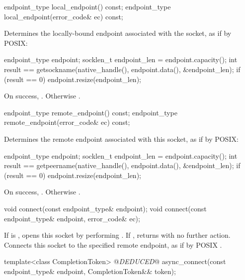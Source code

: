 \begin{itemdecl}
endpoint_type local_endpoint() const;
endpoint_type local_endpoint(error_code& ec) const;
\end{itemdecl}

\begin{itemdescr}
\pnum
\effects Determines the locally-bound endpoint associated with the socket, as if by POSIX: 
\begin{codeblock}
endpoint_type endpoint;
socklen_t endpoint_len = endpoint.capacity();
int result == getsockname(native_handle(), endpoint.data(), &endpoint_len);
if (result == 0)
  endpoint.resize(endpoint_len);
\end{codeblock}


\pnum
\returns On success, . Otherwise .
\end{itemdescr}

\begin{itemdecl}
endpoint_type remote_endpoint() const;
endpoint_type remote_endpoint(error_code& ec) const;
\end{itemdecl}

\begin{itemdescr}
\pnum
\effects Determines the remote endpoint associated with this socket, as if by POSIX: 
\begin{codeblock}
endpoint_type endpoint;
socklen_t endpoint_len = endpoint.capacity();
int result == getpeername(native_handle(), endpoint.data(), &endpoint_len);
if (result == 0)
  endpoint.resize(endpoint_len);
\end{codeblock}


\pnum
\returns On success, . Otherwise .
\end{itemdescr}

\begin{itemdecl}
void connect(const endpoint_type& endpoint);
void connect(const endpoint_type& endpoint, error_code& ec);
\end{itemdecl}

\begin{itemdescr}
\pnum
\effects If  is , opens this socket by performing . If , returns with no further action. Connects this socket to the specified remote endpoint, as if by POSIX .
\end{itemdescr}

\begin{itemdecl}
template<class CompletionToken>
  @\textit{DEDUCED}@ async_connect(const endpoint_type& endpoint, CompletionToken&& token);
\end{itemdecl}


